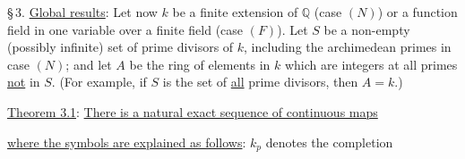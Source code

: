 \S\,3. \uline{Global results}: Let now $k$ be a finite extension of $\mathbb Q$ (case $(N)$) or a function field in one variable over a finite field (case $(F)$). Let $S$ be a non-empty (possibly infinite) set of prime divisors of $k$, including the archimedean primes in case $(N)$; and let $A$ be the ring of elements in $k$ which are integers at all primes \uline{not} in $S$. (For example, if $S$ is the set of \uline{all} prime divisors, then $A=k$.)

\uline{Theorem 3.1}: \uline{There is a natural exact sequence of continuous maps}


\uline{where the symbols are explained as follows}: $k_p$ denotes the completion
